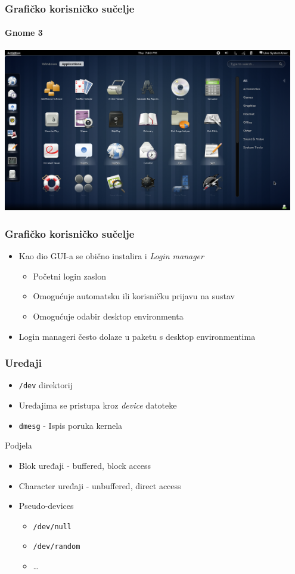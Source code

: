 \documentclass[table,usenames,dvipsnames]{beamer}
\newcommand{\shell}[1]{\texttt{#1}}
\begin{document}
\begin{frame}[t]
	\frametitle{Grafičko korisničko sučelje}
	\framesubtitle{Gnome 3}
	\centering \includegraphics[width=0.95\textwidth]{gnome3.png}
\end{frame}

\begin{frame}[t]
	\frametitle{Grafičko korisničko sučelje}
	\begin{itemize}
		\item Kao dio GUI-a se obično instalira i \emph{Login manager}
		\begin{itemize}
			\item Početni login zaslon
			\item Omogućuje automatsku ili korisničku prijavu na sustav
			\item Omogućuje odabir desktop environmenta
		\end{itemize}
		\item Login manageri često dolaze u paketu s desktop environmentima
	\end{itemize}
\end{frame}

\begin{frame}[t]
	\frametitle{Uređaji}
	\begin{itemize}
		\item \shell{/dev} direktorij
		\item Uređajima se pristupa kroz \emph{device} datoteke
		\item \shell{dmesg} - Ispis poruka kernela
	\end{itemize}
	Podjela
	\begin{itemize}
		\item Blok uređaji - buffered, block access
		\item Character uređaji - unbuffered, direct access
		\item Pseudo-devices
		\begin{itemize}
			\item \shell{/dev/null}
			\item \shell{/dev/random}
			\item \dots
		\end{itemize}
	\end{itemize}
\end{frame}
\end{document}
